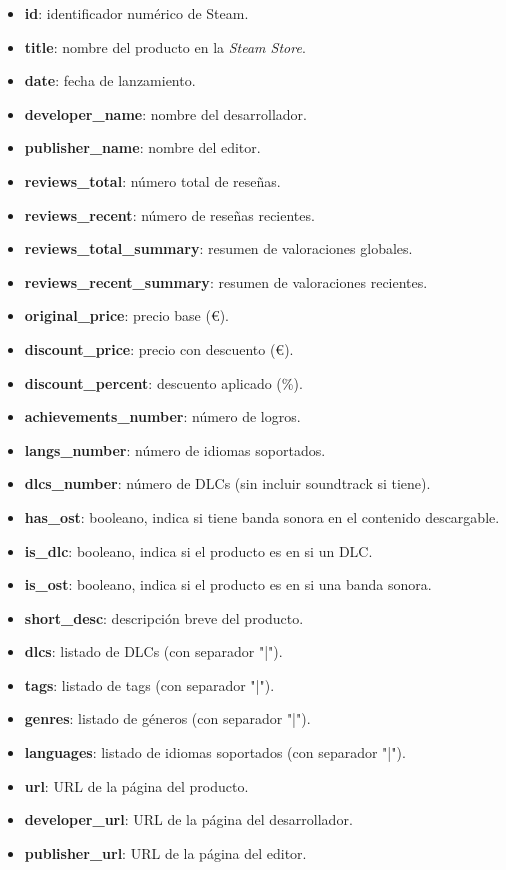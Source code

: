 \documentclass[
]{article}
\begin{document}
\begin{itemize}[itemsep=-4pt]
  \item \textbf{id}: identificador numérico de Steam.
  \item \textbf{title}: nombre del producto en la \textit{Steam Store}.
  \item \textbf{date}: fecha de lanzamiento.
  \item \textbf{developer\_name}: nombre del desarrollador.
  \item \textbf{publisher\_name}: nombre del editor.
  \item \textbf{reviews\_total}: número total de reseñas.
  \item \textbf{reviews\_recent}: número de reseñas recientes.
  \item \textbf{reviews\_total\_summary}: resumen de valoraciones globales.
  \item \textbf{reviews\_recent\_summary}: resumen de valoraciones recientes.
  \item \textbf{original\_price}: precio base (€).
  \item \textbf{discount\_price}: precio con descuento (€).
  \item \textbf{discount\_percent}: descuento aplicado (\%).
  \item \textbf{achievements\_number}: número de logros.
  \item \textbf{langs\_number}: número de idiomas soportados.
  \item \textbf{dlcs\_number}: número de DLCs (sin incluir soundtrack si tiene).
  \item \textbf{has\_ost}: booleano, indica si tiene banda sonora en el contenido descargable.
  \item \textbf{is\_dlc}: booleano, indica si el producto es en si un DLC.
  \item \textbf{is\_ost}: booleano, indica si el producto es en si una banda sonora.
  \item \textbf{short\_desc}: descripción breve del producto.
  \item \textbf{dlcs}: listado de DLCs (con separador "|").
  \item \textbf{tags}: listado de tags (con separador "|").
  \item \textbf{genres}: listado de géneros (con separador "|").
  \item \textbf{languages}: listado de idiomas soportados (con separador "|").
  \item \textbf{url}: URL de la página del producto.
  \item \textbf{developer\_url}: URL de la página del desarrollador.
  \item \textbf{publisher\_url}: URL de la página del editor.
\end{itemize}
\end{document}
